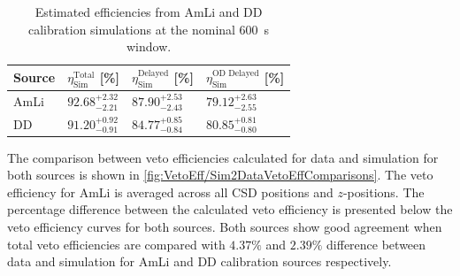 \renewcommand{\arraystretch}{1.5}
\begin{table}[h!]
    \centering
    \caption{Estimated efficiencies from AmLi and DD calibration simulations at the nominal 600~\textmu s window.}
    \begin{tabular}{llll}
    \hline\hline
    \textbf{Source} & \textbf{$\eta^\text{Total}_\text{Sim}$ [\%]} & \textbf{$\eta^\text{Delayed}_\text{Sim}$ [\%]} & \textbf{$\eta^\text{OD Delayed}_\text{Sim}$ [\%]}\\
    \hline
    AmLi & $92.68^{+2.32}_{-2.21}$ & $87.90^{+2.53}_{-2.43}$ & $79.12^{+2.63}_{-2.55}$ \\
    DD & $91.20^{+0.92}_{-0.91}$ & $84.77^{+0.85}_{-0.84}$ & $80.85^{+0.81}_{-0.80}$\\
    \hline\hline
    \end{tabular}
    \label{tab:VetoEff/CalibrationSimulationEfficiencies}
\end{table}
\renewcommand{\arraystretch}{1}

The comparison between veto efficiencies calculated for data and simulation for both sources is shown in \autoref{fig:VetoEff/Sim2DataVetoEffComparisons}. The veto efficiency for AmLi is averaged across all CSD positions and $z$-positions. The percentage difference between the calculated veto efficiency is presented below the veto efficiency curves for both sources. Both sources show good agreement when total veto efficiencies are compared with $4.37\%$ and $2.39\%$ difference between data and simulation for AmLi and DD calibration sources respectively.

